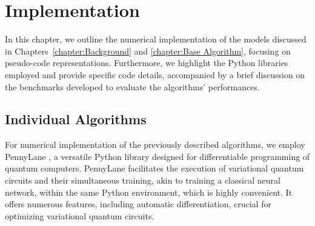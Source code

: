 
\chapter{Implementation}
\label{chapter:implementation}

In this chapter, we outline the numerical implementation of the models discussed in Chapters~\ref{chapter:Background} and \ref{chapter:Base Algorithm}, focusing on pseudo-code representations. Furthermore, we highlight the Python libraries employed and provide specific code details, accompanied by a brief discussion on the benchmarks developed to evaluate the algorithms' performances.



\section{Individual Algorithms}
\label{section:Individual_Algorithms}

For numerical implementation of the previously described algorithms, we employ PennyLane \cite{Pennylane}, a versatile Python library designed for differentiable programming of quantum computers. PennyLane facilitates the execution of variational quantum circuits and their simultaneous training, akin to training a classical neural network, within the same Python environment, which is highly convenient. It offers numerous features, including automatic differentiation, crucial for optimizing variational quantum circuits.


